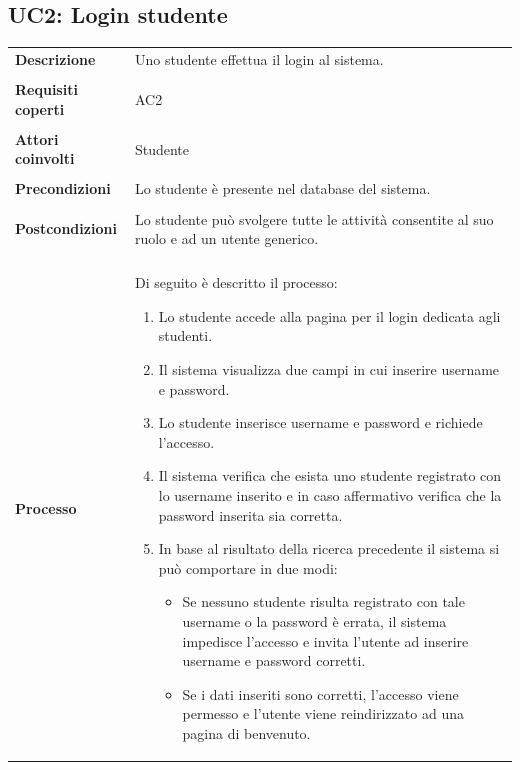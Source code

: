 \documentclass[10pt,a4paper]{report}
\begin{document}
	\subsection{UC2: Login studente}
	\begin{tabular}{lp{}}
		\textbf{Descrizione}&Uno studente effettua il login al sistema.\\
		\\
		\textbf{Requisiti coperti}&AC2\\
		\\
		\textbf{Attori coinvolti}&Studente\\
		\\
		\textbf{Precondizioni}&Lo studente è presente nel database del sistema.\\
		\\
		\textbf{Postcondizioni}&Lo studente può svolgere tutte le attività consentite al suo ruolo e ad un utente generico.\\
		\\
		\textbf{Processo}&Di seguito è descritto il processo:
		\begin{enumerate}
			\item Lo studente accede alla pagina per il login dedicata agli studenti.
			\item Il sistema visualizza due campi in cui inserire username e password.
			\item Lo studente inserisce username e password e richiede l'accesso.
			\item Il sistema verifica che esista uno studente registrato con lo username inserito e in caso affermativo verifica che la password inserita sia corretta.
			\item In base al risultato della ricerca precedente il sistema si può comportare in due modi:
			\begin{itemize}
				\item Se nessuno studente risulta registrato con tale username o la password è errata, il sistema impedisce l'accesso e invita l'utente ad inserire username e password corretti.
				\item Se i dati inseriti sono corretti, l'accesso viene permesso e l'utente viene reindirizzato ad una pagina di benvenuto.
			\end{itemize} 
		\end{enumerate}
	\end{tabular}
\end{document}
